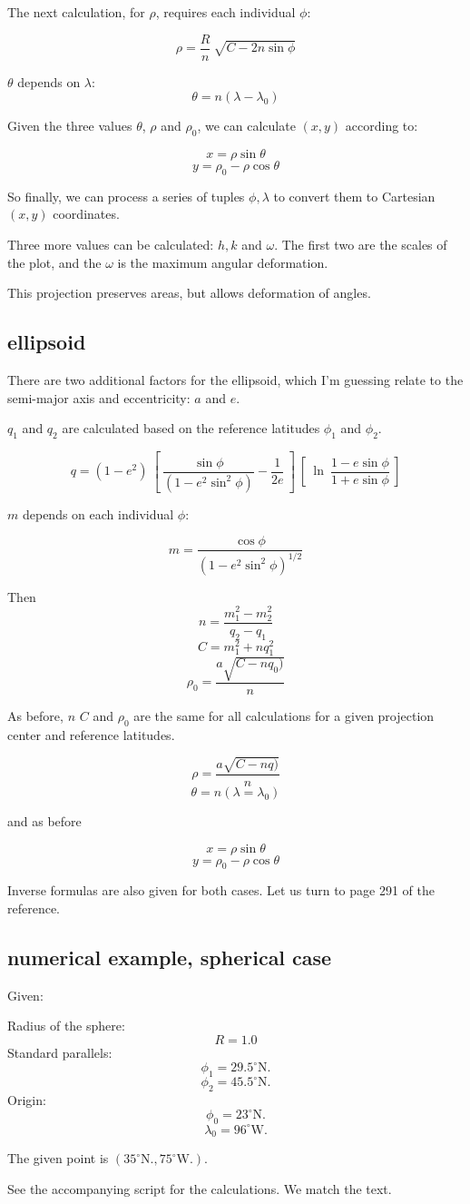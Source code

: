 \documentclass[11pt, oneside]{article}
\begin{document}
The next calculation, for $\rho$, requires each individual $\phi$:

\[ \rho = \frac{R}{n} \ \sqrt{C - 2n \sin \phi} \]

$\theta$ depends on $\lambda$:
\[ \theta = n(\lambda - \lambda_0) \]

Given the three values $\theta$, $\rho$ and $\rho_0$, we can calculate $(x,y)$ according to:

\[ x = \rho \sin \theta \]
\[ y = \rho_0 - \rho \cos \theta \]

So finally, we can process a series of tuples $\phi, \lambda$ to convert them to Cartesian $(x,y)$ coordinates.

Three more values can be calculated:  $h, k$ and $\omega$.  The first two are the scales of the plot, and the $\omega$ is the maximum angular deformation.

This projection preserves areas, but allows deformation of angles.

\subsection*{ellipsoid}

There are two additional factors for the ellipsoid, which I'm guessing relate to the semi-major axis and eccentricity:   $a$ and $e$.

$q_1$ and $q_2$ are calculated based on the reference latitudes $\phi_1$ and $\phi_2$.

\[ q = (1-e^2) \ [ \  \frac{\sin \phi}{(1- e^2 \sin^2 \phi)} - \frac{1}{2e} \ ] \ [ \ \ln \ \frac{1 - e \sin \phi}{1 + e \sin \phi} \ ] \]

$m$ depends on each individual $\phi$:

\[ m = \frac{\cos \phi}{(1 - e^2 \sin^2 \phi)^{1/2}} \]

Then
\[ n = \frac{m_1^2 - m_2^2}{q_2 - q_1} \]
\[ C = m_1^2 + nq_1^2 \]
\[ \rho_0 = \frac{a \sqrt{C - nq_0)} }{n} \]

As before, $n$ $C$ and $\rho_0$ are the same for all calculations for a given projection center and reference latitudes.

\[ \rho = \frac{a \sqrt{C - nq)} }{n} \]
\[ \theta = n (\lambda = \lambda_0) \]

and as before

\[ x = \rho \sin \theta \]
\[ y = \rho_0 - \rho \cos \theta \]

Inverse formulas are also given for both cases.  Let us turn to page 291 of the reference.

\subsection*{numerical example, spherical case}

Given:

Radius of the sphere:
\[ R = 1.0 \]
Standard parallels:
\[ \phi_1 = 29.5^{\circ} \text{N}. \]
\[ \phi_2 = 45.5^{\circ} \text{N}. \]
Origin:
\[ \phi_0 = 23^{\circ} \text{N}. \]
\[ \lambda_0 = 96^{\circ} \text{W}. \]

The given point is $(35^{\circ} \text{N}., 75^{\circ} \text{W}.)$.

See the accompanying script for the calculations.  We match the text.
\end{document}
